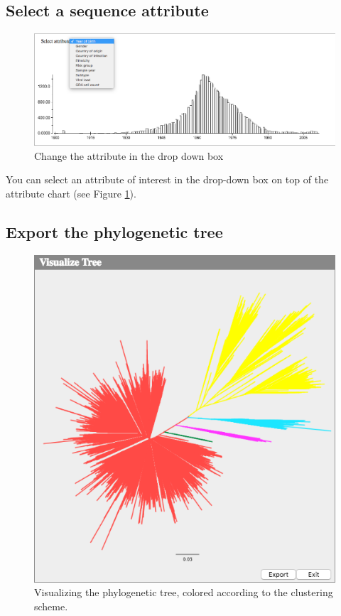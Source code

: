 \documentclass[a4paper, 11pt]{article} %
\begin{document}
\subsection{Select a sequence attribute}
\begin{figure}[H]
\centering
\includegraphics[scale=0.38]{images/change_attr.PNG}
\vspace{-0.75cm}
\caption{Change the attribute in the drop down box}
\label{fig:change_attr}
\end{figure}
You can select an attribute of interest in the drop-down box on top of the attribute chart (see Figure \ref{fig:change_attr}).


\subsection{Export the phylogenetic tree}
\begin{figure}[H]
\centering
\includegraphics[scale=0.50]{images/view_tree.PNG}
\vspace{-0.25cm}
\caption{Visualizing the phylogenetic tree, colored according to the clustering scheme.}
\label{fig:view_tree}
\end{figure}
\end{document}
